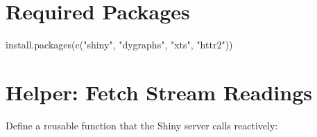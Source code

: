 \documentclass[
  11pt,
  letterpaper,
  DIV=11,
  numbers=noendperiod]{scrreprt}
\newenvironment{Shaded}{\begin{snugshade}}{\end{snugshade}}
\newcommand{\FunctionTok}[1]{\textcolor[rgb]{0.28,0.35,0.67}{#1}}
\newcommand{\NormalTok}[1]{\textcolor[rgb]{0.00,0.23,0.31}{#1}}
\newcommand{\StringTok}[1]{\textcolor[rgb]{0.13,0.47,0.30}{#1}}
\begin{document}
\section{Required Packages}\label{required-packages}

\begin{Shaded}
\begin{Highlighting}[]
\FunctionTok{install.packages}\NormalTok{(}\FunctionTok{c}\NormalTok{(}\StringTok{"shiny"}\NormalTok{, }\StringTok{"dygraphs"}\NormalTok{, }\StringTok{"xts"}\NormalTok{, }\StringTok{"httr2"}\NormalTok{))}
\end{Highlighting}
\end{Shaded}

\section{Helper: Fetch Stream
Readings}\label{helper-fetch-stream-readings}

Define a reusable function that the Shiny server calls reactively:
\end{document}
